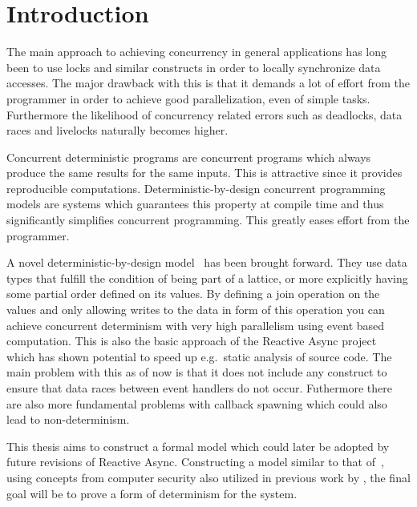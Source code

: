 \chapter{Introduction}
\label{cha:introduction}

The main approach to achieving concurrency in general applications has long been
to use locks and similar constructs in order to locally synchronize data
accesses. The major drawback with this is that it demands a lot of effort from
the programmer in order to achieve good parallelization, even of simple tasks.
Furthermore the likelihood of concurrency related errors such as deadlocks, data
races and livelocks naturally becomes higher. 

Concurrent deterministic programs are concurrent programs which always produce
the same results for the same inputs. This is attractive since it provides
reproducible computations.  Deterministic-by-design concurrent programming
models are systems which guarantees this property at compile time and thus
significantly simplifies concurrent programming. This greatly eases effort
from the programmer. 

A novel deterministic-by-design model~\parencite{kuper2013lvars,
kuper2014freeze} has been brought forward.  They use data types that fulfill the
condition of being part of a lattice, or more explicitly having some partial
order defined on its values. By defining a join operation on the values and only
allowing writes to the data in form of this operation you can achieve concurrent
determinism with very high parallelism using event based computation.  This is
also the basic approach of the Reactive Async
project~\parencite{conf/scala/HallerGES16} which has shown potential to speed up
e.g.\ static analysis of source code. The main problem with this as of now is
that it does not include any construct to ensure that data races between event
handlers do not occur. Futhermore there are also more fundamental problems with
callback spawning which could also lead to non-determinism.

This thesis aims to construct a formal model which could later be adopted by
future revisions of Reactive Async. Constructing a model similar to that
of~\parencite{kuper2014freeze}, using concepts from computer security also
utilized in previous work by \textcite{conf/oopsla/HallerL16}, the final goal
will be to prove a form of determinism for the system.
